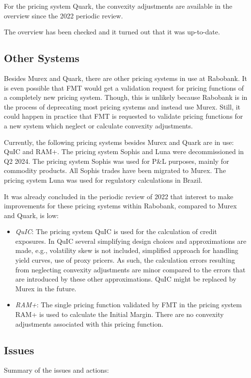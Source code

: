 \documentclass[reviewdoc]{pmv_report} %
\begin{document}
For the pricing system Quark, the convexity adjustments are available in the overview since the 2022 periodic review.

The overview has been checked and it turned out that it was up-to-date.

\subsection{Other Systems}
\label{sec:notInScope}
Besides Murex and Quark, there are other pricing systems in use at Rabobank.
It is even possible that FMT would get a validation request for pricing functions of a completely new pricing system.
Though, this is unlikely because Rabobank is in the process of deprecating most pricing systems and instead use Murex.
Still, it could happen in practice that FMT is requested to validate pricing functions for a new system which neglect or calculate convexity adjustments.

Currently, the following pricing systems besides Murex and Quark are in use: QuIC and RAM+.
The pricing system Sophis and Luna were decommissioned in Q2 2024.
The pricing system Sophis was used for P\&L purposes, mainly for commodity products.
All Sophis trades have been migrated to Murex.
The pricing system Luna was used for regulatory calculations in Brazil.

It was already concluded in the periodic review of 2022 that interest to make improvements for these pricing systems within Rabobank, compared to Murex and Quark, is low:
\begin{itemize}
  \item \textit{QuIC}: The pricing system QuIC is used for the calculation of credit exposures.
  In QuIC several simplifying design choices and approximations are made, e.g., volatility skew is not included, simplified approach for handling yield curves, use of proxy pricers.
  As such, the calculation errors resulting from neglecting convexity adjustments are minor compared to the errors that are introduced by these other approximations.
  QuIC might be replaced by Murex in the future.
  \item \textit{RAM+}: The single pricing function validated by FMT in the pricing system RAM+ is used to calculate the Initial Margin.
  There are no convexity adjustments associated with this pricing function.
\end{itemize}

\subsection{Issues}
\label{sec:InScopeIssues}
Summary of the issues and actions:
\begin{itemize}
  \issueactionI
\end{itemize}
\end{document}
